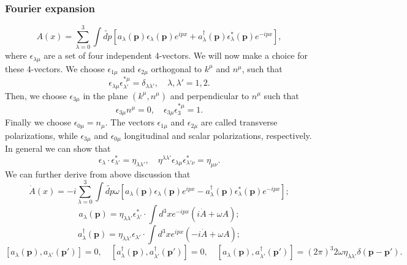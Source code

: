 \subsubsection{Fourier expansion}
\[A(x) = \sum_{\lambda=0}^{3} \int \widetilde{dp} [a_{\lambda}(\bm{p}) \epsilon_{\lambda}(\bm{p})e^{ipx} + a^{\dagger}_{\lambda}(\bm{p}) \epsilon^*_{\lambda}(\bm{p})e^{-ipx}],\]
where $\epsilon_{\lambda \mu}$ are a set of four independent 4-vectors.  We will now make a choice for these 4-vectors. We choose $\epsilon_{1\mu}$ and $\epsilon_{2\mu}$ orthogonal to $k^{\mu}$ and $n^{\mu}$, such that
\[\epsilon_{\lambda \mu} \epsilon^{*\mu}_{\lambda'} = \delta_{\lambda \lambda'} , \quad \lambda,\lambda' = 1,2.\]
Then, we choose $\epsilon_{3\mu}$ in the plane $(k^{\mu},n^{\mu})$ and perpendicular to $n^{\mu}$ such that
\[\epsilon_{3\mu} n^{\mu} = 0 , \quad \epsilon_{3\mu} \epsilon^{*\mu}_{3} = 1.\]
Finally we choose $\epsilon_{0\mu} = n_{\mu}$. The vectors $\epsilon_{1\mu}$ and $\epsilon_{2\mu}$ are called transverse polarizations, while $\epsilon_{3\mu}$ and $\epsilon_{0\mu}$ longitudinal and scalar polarizations, respectively.
In general we can show that
\[\epsilon_{\lambda} \cdot \epsilon^*_{\lambda'} = \eta_{\lambda \lambda'} , \quad \eta^{\lambda \lambda'} \epsilon_{\lambda \mu} \epsilon^*_{\lambda' \nu} = \eta_{\mu \nu} .\]
We can further derive from above discussion that
\[\dot{A}(x) = -i \sum_{\lambda=0}^{3} \int \widetilde{dp} \omega [a_{\lambda}(\bm{p}) \epsilon_{\lambda}(\bm{p})e^{ipx} - a^{\dagger}_{\lambda}(\bm{p}) \epsilon^*_{\lambda}(\bm{p})e^{-ipx}];\]
\[ a_{\lambda}(\bm{p}) =  \eta_{\lambda \lambda'} \epsilon^*_{\lambda'} \cdot \int d^3x e^{-ipx}(i\dot{A}+\omega A);\]
\[ a^{\dagger}_{\lambda}(\bm{p}) =  \eta_{\lambda \lambda'} \epsilon_{\lambda'} \cdot \int d^3x e^{ipx}(-i\dot{A}+\omega A);\]
\[[a_{\lambda}(\bm{p}),a_{\lambda'}(\bm{p'})] = 0 , \quad [a^{\dagger}_{\lambda}(\bm{p}),a^{\dagger}_{\lambda'}(\bm{p'})] = 0 , \quad [a_{\lambda}(\bm{p}),a^{\dagger}_{\lambda'}(\bm{p'})] = (2\pi)^3 2\omega \eta_{\lambda \lambda'} \delta(\bm{p} - \bm{p}').\]

